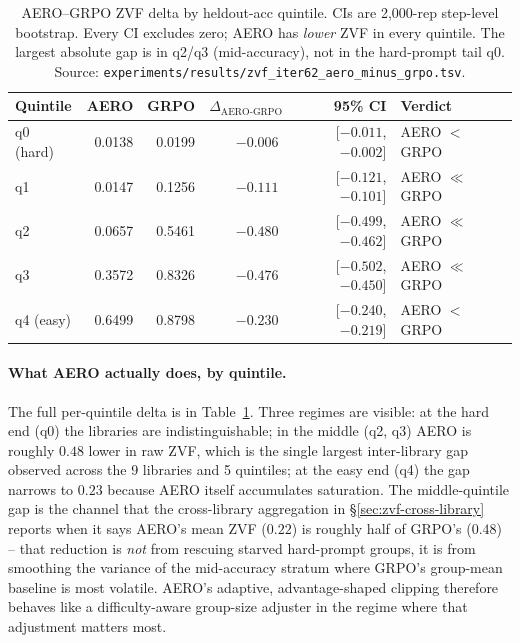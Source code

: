 \documentclass{article}
\begin{document}
\begin{table}[htbp]
\centering
\small
\setlength{\tabcolsep}{4pt}
\begin{tabular}{lrrrrl}
\hline
Quintile & AERO & GRPO & $\Delta_{\text{AERO-GRPO}}$ & 95\% CI & Verdict \\
\hline
q0 (hard)   & 0.0138 & 0.0199 & $-0.006$ & [$-0.011$, $-0.002$] & AERO $<$ GRPO \\
q1          & 0.0147 & 0.1256 & $-0.111$ & [$-0.121$, $-0.101$] & AERO $\ll$ GRPO \\
q2          & 0.0657 & 0.5461 & $-0.480$ & [$-0.499$, $-0.462$] & AERO $\ll$ GRPO \\
q3          & 0.3572 & 0.8326 & $-0.476$ & [$-0.502$, $-0.450$] & AERO $\ll$ GRPO \\
q4 (easy)   & 0.6499 & 0.8798 & $-0.230$ & [$-0.240$, $-0.219$] & AERO $<$ GRPO \\
\hline
\end{tabular}
\caption{AERO--GRPO ZVF delta by heldout-acc quintile. CIs are
2{,}000-rep step-level bootstrap. Every CI excludes zero; AERO has
\emph{lower} ZVF in every quintile. The largest absolute gap is in
q2/q3 (mid-accuracy), not in the hard-prompt tail q0. Source:
\texttt{experiments/results/zvf\_iter62\_aero\_minus\_grpo.tsv}.}
\label{tab:zvf-aero-delta}
\end{table}

\paragraph{What AERO actually does, by quintile.}
The full per-quintile delta is in Table~\ref{tab:zvf-aero-delta}.
Three regimes are visible: at the hard end (q0) the libraries are
indistinguishable; in the middle (q2, q3) AERO is roughly
$0.48$ lower in raw ZVF, which is the single largest inter-library
gap observed across the 9 libraries and 5 quintiles; at the easy end
(q4) the gap narrows to $0.23$ because AERO itself accumulates
saturation. The middle-quintile gap is the channel that the
cross-library aggregation in \S\ref{sec:zvf-cross-library} reports
when it says AERO's mean ZVF ($0.22$) is roughly half of GRPO's
($0.48$) -- that reduction is \emph{not} from rescuing starved
hard-prompt groups, it is from smoothing the variance of the
mid-accuracy stratum where GRPO's group-mean baseline is most
volatile. AERO's adaptive, advantage-shaped clipping therefore
behaves like a difficulty-aware group-size adjuster in the regime
where that adjustment matters most.
\end{document}
